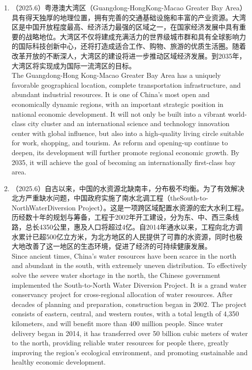 ﻿\documentclass[lang=cn,11pt]{elegantbook}
\begin{document}
\begin{enumerate}
    \item （2025.6）粤港澳大湾区（Guangdong-HongKong-Macao Greater Bay Area）具有得天独厚的地理位置，拥有完善的交通基础设施和丰富的产业资源。大湾区是中国开放程度最高、经济活力最强的区域之一，在国家经济发展中具有重要的战略地位。大湾区不仅将建成充满活力的世界级城市群和具有全球影响力的国际科技创新中心，还将打造成适合工作、购物、旅游的优质生活圈。随着改革开放的不断深人，大湾区的建设将进一步推动区域经济发展。到2035年，大湾区将实现成为国际一流湾区的目标。\\The Guangdong-Hong Kong-Macao Greater Bay Area has a uniquely favorable geographical location, complete transportation infrastructure, and abundant industrial resources. It is one of China’s most open and economically dynamic regions, with an important strategic position in national economic development. It will not only be built into a vibrant world-class city cluster and an international science and technology innovation center with global influence, but also into a high-quality living circle suitable for work, shopping, and tourism. As reform and opening-up continue to deepen, its development will further promote regional economic growth. By 2035, it will achieve the goal of becoming an internationally first-class bay area.
    \item （2025.6）自古以来，中国的水资源北缺南丰，分布极不均衡。为了有效解决北方严重缺水问题，中国政府实施了南水北调工程（theSouth-to-NorthWaterDiversion Project）。这是一项跨区域配置水资源的宏大水利工程。历经数十年的规划与筹备，工程于2002年开工建设，分为东、中、西三条线路，总长4350公里，惠及人口将超过4亿。自2014年通水以来，工程向北方调水累计已超500亿立方米，为北方地区的人民提供了可靠的水资源，同时也极大地改善了这一地区的生态环境，促进了经济的可持续健康发展。\\Since ancient times, China’s water resources have been scarce in the north and abundant in the south, with extremely uneven distribution. To effectively solve the severe water shortage in the north, the Chinese government implemented the South-to-North Water Diversion Project. It is a grand water conservancy project for cross-regional allocation of water resources. After decades of planning and preparation, construction began in 2002. The project consists of eastern, central, and western routes, with a total length of 4,350 kilometers, and will benefit more than 400 million people. Since water delivery began in 2014, it has transferred over 50 billion cubic meters of water to the north, providing reliable water resources for people there, greatly improving the region’s ecological environment, and promoting sustainable and healthy economic development.

\end{enumerate}
\end{document}
